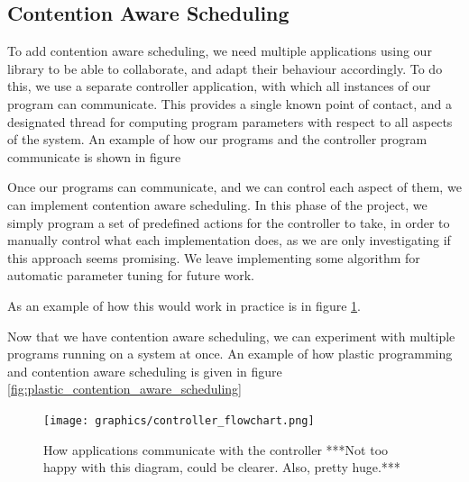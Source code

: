 \subsection{Contention Aware Scheduling}
\label{subsection:design_contention_aware_scheduling}

To add contention aware scheduling, we need multiple applications using our library to be able to collaborate, and adapt their behaviour accordingly. To do this, we use a separate controller application, with which all instances of our program can communicate. This provides a single known point of contact, and a designated thread for computing program parameters with respect to all aspects of the system. An example of how our programs and the controller program communicate is shown in figure 

Once our programs can communicate, and we can control each aspect of them, we can implement contention aware scheduling. In this phase of the project, we simply program a set of predefined actions for the controller to take, in order to manually control what each implementation does, as we are only investigating if this approach seems promising. We leave implementing some algorithm for automatic parameter tuning for future work.

As an example of how this would work in practice is in figure \ref{fig:controller_flowchart}.

Now that we have contention aware scheduling, we can experiment with multiple programs running on a system at once. An example of how plastic programming and contention aware scheduling is given in figure \ref{fig:plastic_contention_aware_scheduling}




\begin{figure}
	\texttt{[image: graphics/controller\_flowchart.png]}
	\caption{How applications communicate with the controller ***Not too happy with this diagram, could be clearer. Also, pretty huge.***}
	\label{fig:controller_flowchart}
\end{figure}

